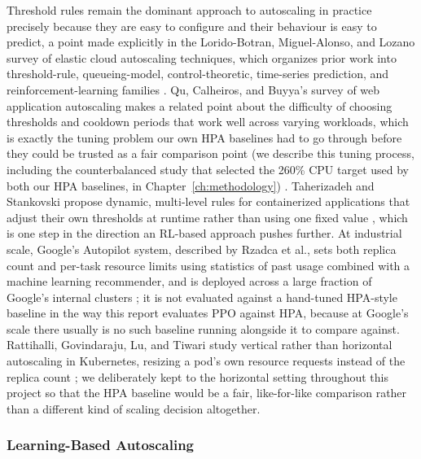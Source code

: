 Threshold rules remain the dominant approach to autoscaling in practice
precisely because they are easy to configure and their behaviour is easy to
predict, a point made explicitly in the Lorido-Botran, Miguel-Alonso, and
Lozano survey of elastic cloud autoscaling techniques, which organizes prior
work into threshold-rule, queueing-model, control-theoretic, time-series
prediction, and reinforcement-learning families
\cite{lorido2014review}. Qu, Calheiros, and Buyya's survey of web
application autoscaling makes a related point about the difficulty of
choosing thresholds and cooldown periods that work well across varying
workloads, which is exactly the tuning problem our own HPA baselines had to
go through before they could be trusted as a fair comparison point (we
describe this tuning process, including the counterbalanced study that
selected the 260\% CPU target used by both our HPA baselines, in
Chapter~\ref{ch:methodology}) \cite{qu2018survey}. Taherizadeh and
Stankovski propose dynamic, multi-level rules for containerized applications
that adjust their own thresholds at runtime rather than using one fixed
value \cite{taherizadeh2019dynamic}, which is one step in the direction an
RL-based approach pushes further. At industrial scale, Google's Autopilot
system, described by Rzadca et al., sets both replica count and per-task
resource limits using statistics of past usage combined with a machine
learning recommender, and is deployed across a large fraction of Google's
internal clusters \cite{rzadca2020autopilot}; it is not evaluated against a
hand-tuned HPA-style baseline in the way this report evaluates PPO against
HPA, because at Google's scale there usually is no such baseline running
alongside it to compare against. Rattihalli, Govindaraju, Lu, and Tiwari
study vertical rather than horizontal autoscaling in Kubernetes, resizing a
pod's own resource requests instead of the replica count
\cite{rattihalli2019vertical}; we deliberately kept to the horizontal
setting throughout this project so that the HPA baseline would be a fair,
like-for-like comparison rather than a different kind of scaling decision
altogether.

\subsubsection{Learning-Based Autoscaling}

